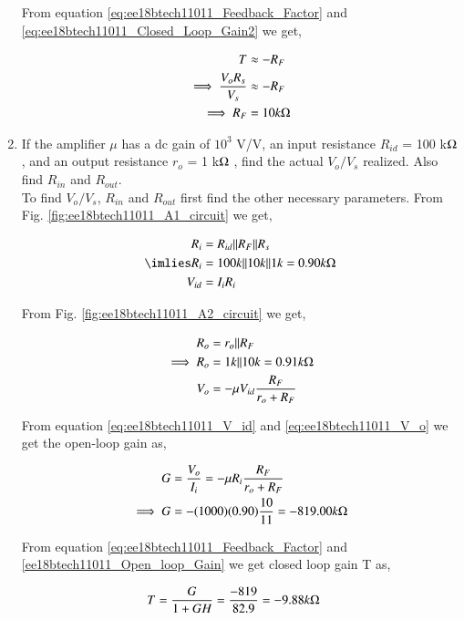 \begin{enumerate}[label=\arabic*.,ref=\theenumi]
From equation \ref{eq:ee18btech11011_Feedback_Factor} and \ref{eq:ee18btech11011_Closed_Loop_Gain2} we get,

\begin{align}
T &\approx -R_{F}\\
\implies \frac{V_{o}R_s}{V_{s}} &\approx -R_{F}\\
\implies R_{F} &= 10k\ohm
\end{align}
\item If the amplifier $\mu$ has a dc gain of $10^3$ V/V, an input resistance $R_{i d}$ = 100 k$\ohm$ , and an output resistance $r_{o}$ = 1 k$\ohm$ , find the actual $V_{o}/V_{s}$ realized. Also find $R_{i n}$ and $R_{o u t}$.
\\
\solution To find $V_{o}/V_{s}$, $R_{i n}$ and $R_{o u t}$ first find the other necessary parameters.
From Fig. \ref{fig:ee18btech11011_A1_circuit} we get,

\begin{align}
R_{i} &= R_{i d}\|R_{F}\|R_{s}\\
\label{ee18btech11011_R_i}
\imlies R_{i} &= 100k\|10k\|1k = 0.90k\ohm\\
\label{eq:ee18btech11011_V_id}
V_{i d} &= I_{i}R_{i}
\end{align}

From Fig. \ref{fig:ee18btech11011_A2_circuit} we get,

\begin{align}
R_{o} &= r_{o}\|R_{F}\\
\label{ee18btech11011_R_o}
\implies R_{o} &= 1k\|10k = 0.91k\ohm\\
\label{eq:ee18btech11011_V_o}
V_{o} &= -\mu V_{i d}\frac{R_{F}}{r_{o} + R_{F}}
\end{align}

From equation \ref{eq:ee18btech11011_V_id} and \ref{eq:ee18btech11011_V_o} we get the open-loop gain as,

\begin{align}
G &= \frac{V_{o}}{I_{i}} = -\mu R_{i}\frac{R_{F}}{r_{o} + R_{F}}
\\
\label{ee18btech11011_Open_loop_Gain}
\implies G &= -(1000)(0.90)\frac{10}{11} = -819.00k\ohm
\end{align}

From equation \ref{eq:ee18btech11011_Feedback_Factor} and \ref{ee18btech11011_Open_loop_Gain} we get closed loop gain T as,

\begin{align}
T &= \frac{G}{1+GH} = \frac{-819}{82.9} = -9.88k\ohm
\end{align}


\end{enumerate}
